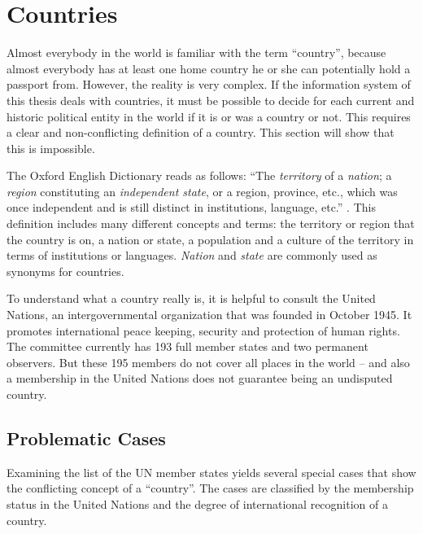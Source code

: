 \section{Countries} %
\label{sec:countries}

Almost everybody in the world is familiar with the term ``country'', because almost everybody has at least one home country he or she can potentially hold a passport from. However, the reality is very complex. If the information system of this thesis deals with countries, it must be possible to decide for each current and historic political entity in the world if it is or was a country or not. This requires a clear and non-conflicting definition of a country. This section will show that this is impossible.

The Oxford English Dictionary reads as follows: ``The \emph{territory} of a \emph{nation}; a \emph{region} constituting an \emph{independent state}, or a region, province, etc., which was once independent and is still distinct in institutions, language, etc.'' \cite{oxendict}.
This definition includes many different concepts and terms: the territory or region that the country is on, a nation or state, a population and a culture of the territory in terms of institutions or languages. \emph{Nation} and \emph{state} are commonly used as synonyms for countries.

To understand what a country really is, it is helpful to consult the United Nations, an intergovernmental organization that was founded in October 1945. It promotes international peace keeping, security and protection of human rights. The committee currently has 193 full member states and two permanent observers\cite{UNmembers}. But these 195 members do not cover all places in the world -- and also a membership in the United Nations does not guarantee being an undisputed country.

\subsection{Problematic Cases} %
\label{sub:special_cases}

Examining the list of the UN member states yields several special cases that show the conflicting concept of a ``country''. The cases are classified by the membership status in the United Nations and the degree of international recognition of a country.



